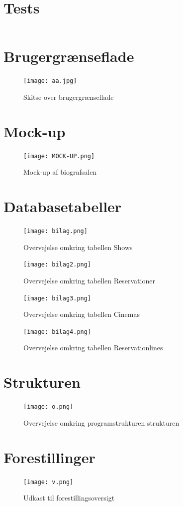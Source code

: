 \documentclass[final]{report}
\begin{document}
\begin{appendix}

\chapter{Tests}
\inputminted{java}{../src/test/DBConnectTest.java}

\chapter{Brugergrænseflade}
\begin{figure}[h]
\centering
\texttt{[image: aa.jpg]}
\caption{Skitse over brugergrænseflade}
\end{figure}

\chapter{Mock-up}
\begin{figure}[h]
\centering
\texttt{[image: MOCK-UP.png]}
\caption{Mock-up af biografsalen}
\end{figure}

\chapter{Databasetabeller}

\begin{figure}[h]
\centering
\texttt{[image: bilag.png]}
\caption{Overvejelse omkring tabellen Shows}
\end{figure}

\begin{figure}[h]
\centering
\texttt{[image: bilag2.png]}
\caption{Overvejelse omkring tabellen Reservationer}
\end{figure}

\begin{figure}[h]
\centering
\texttt{[image: bilag3.png]}
\caption{Overvejelse omkring tabellen Cinemas}
\end{figure}

\begin{figure}[h]
\centering
\texttt{[image: bilag4.png]}
\caption{Overvejelse omkring tabellen Reservationlines}
\end{figure}

\chapter{Strukturen}

\begin{figure}[h]
\centering
\texttt{[image: o.png]}
\caption{Overvejelse omkring programstrukturen strukturen}
\end{figure}

\chapter{Forestillinger}
\begin{figure}[h]
\centering
\texttt{[image: v.png]}
\caption{Udkast til forestillingsoversigt}
\end{figure}

\end{appendix}
\end{document}
